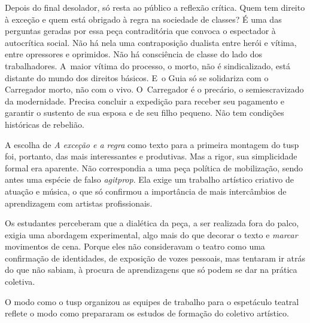 Depois do final desolador, só resta ao público a reflexão crítica.
Quem tem direito à exceção e quem está obrigado à regra na sociedade de
classes? É uma das perguntas geradas por essa peça contraditória que
convoca o espectador à autocrítica social. Não há nela uma contraposição
dualista entre herói e vítima, entre opressores e oprimidos. Não há
consciência de classe do lado dos trabalhadores. A~maior vítima do
processo, o morto, não é sindicalizado, está distante do mundo dos
direitos básicos. E~o Guia só se solidariza com o Carregador morto, não
com o vivo. O~Carregador é o precário, o semiescravizado da
modernidade. Precisa concluir a expedição para receber seu pagamento e
garantir o sustento de sua esposa e de seu filho pequeno. Não tem
condições históricas de rebelião.

A escolha de {\it A exceção e a regra} como texto para a primeira
montagem do {\sc tusp} foi, portanto, das mais interessantes e produtivas. Mas
a rigor, sua simplicidade formal era aparente. Não correspondia a uma
peça política de mobilização, sendo antes uma espécie de falso
{\it agitprop}. Ela exige um trabalho artístico criativo de atuação e
música, o que só confirmou a importância de mais intercâmbios de
aprendizagem com artistas profissionais.

Os estudantes perceberam que a dialética da peça, a ser realizada fora
do palco, exigia uma abordagem experimental, algo mais do que decorar o
texto e {\it marcar} movimentos de cena. Porque eles não consideravam o
teatro como uma confirmação de identidades, de exposição de vozes pessoais,
mas tentaram ir atrás do que não sabiam, à procura de aprendizagens que só
podem se dar na prática coletiva.

\subject{Formação da equipe: artistas-\\-pesquisadores}

O modo como o {\sc tusp} organizou as equipes de trabalho para o espetáculo
teatral reflete o modo como prepararam os estudos de formação do
coletivo artístico.


